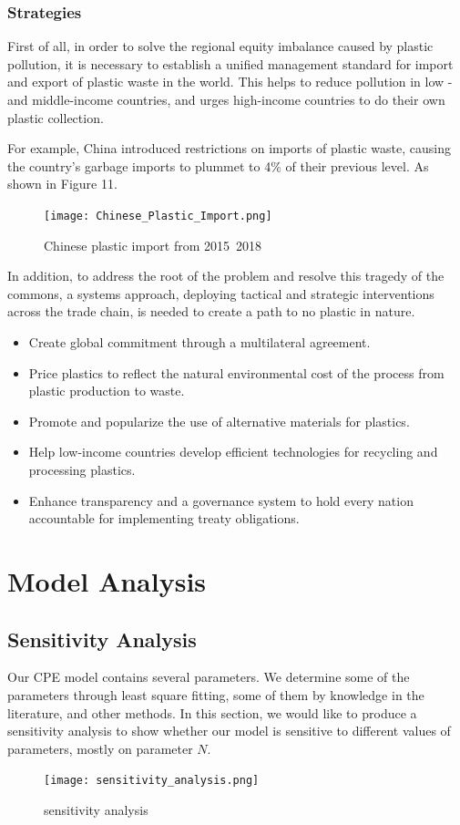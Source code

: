 \documentclass{mcmthesis}
\begin{document}
 \subsubsection{Strategies}
   First of all, in order to solve the regional equity imbalance caused by plastic pollution, it is necessary to establish a unified management standard for import and export of plastic waste in the world. This helps to reduce pollution in low - and middle-income countries, and urges high-income countries to do their own plastic collection.

   For example, China introduced restrictions on imports of plastic waste, causing the country's garbage imports to plummet to 4\% of their previous level. As shown in Figure 11.
   \begin{figure}[H]
    \centering
     \texttt{[image: Chinese\_Plastic\_Import.png]}
	\caption{Chinese plastic import from 2015~2018}
   \end{figure}

   In addition, to address the root of the problem and resolve this tragedy of the commons, a systems approach, deploying tactical and strategic interventions across the trade chain, is needed to create a path to no plastic in nature.
   \begin{itemize}
    \item Create global commitment through a multilateral agreement.
    \item Price plastics to reflect the natural environmental cost of the process from plastic production to waste.
    \item Promote and popularize the use of alternative materials for plastics.
    \item Help low-income countries develop efficient technologies for recycling and processing plastics.
    \item Enhance transparency and a governance system to hold every nation accountable for implementing treaty obligations.
\end{itemize}


\section{Model Analysis}
\subsection{Sensitivity Analysis}
Our CPE model contains several parameters. We determine some of the parameters through least square fitting, some of them by knowledge in the literature, and other methods. In this section,
we would like to produce a sensitivity analysis to show whether our model is sensitive to different
values of parameters, mostly on parameter $N$. 
\begin{figure}[H]
    \centering
     \texttt{[image: sensitivity\_analysis.png]}
	\caption{sensitivity analysis}
   \end{figure}
\end{document}
